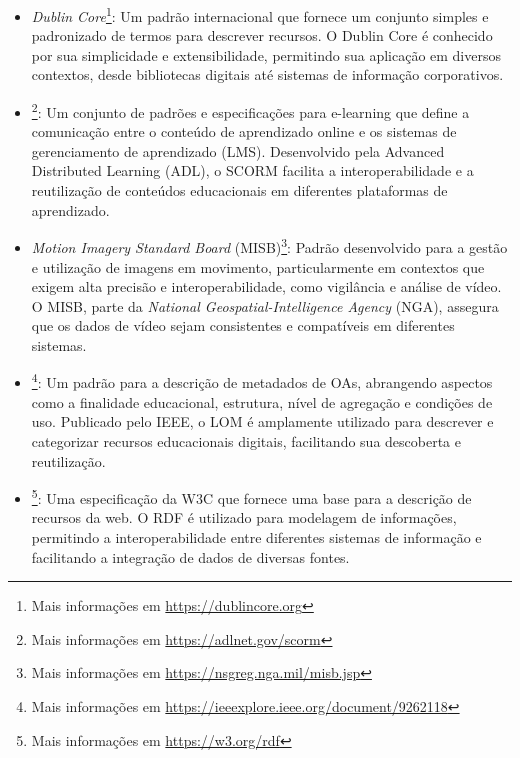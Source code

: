 \begin{itemize}
    \item \textit{Dublin Core}\footnote{Mais informações em \url{https://dublincore.org}}: Um padrão internacional que fornece um conjunto simples e padronizado de termos para descrever recursos. O Dublin Core é conhecido por sua simplicidade e extensibilidade, permitindo sua aplicação em diversos contextos, desde bibliotecas digitais até sistemas de informação corporativos.
    \item {}\footnote{Mais informações em \url{https://adlnet.gov/scorm}}: Um conjunto de padrões e especificações para e-learning que define a comunicação entre o conteúdo de aprendizado online e os sistemas de gerenciamento de aprendizado (LMS). Desenvolvido pela Advanced Distributed Learning (ADL), o SCORM facilita a interoperabilidade e a reutilização de conteúdos educacionais em diferentes plataformas de aprendizado.
    \item \textit{Motion Imagery Standard Board} (MISB)\footnote{Mais informações em \url{https://nsgreg.nga.mil/misb.jsp}}: Padrão desenvolvido para a gestão e utilização de imagens em movimento, particularmente em contextos que exigem alta precisão e interoperabilidade, como vigilância e análise de vídeo. O MISB, parte da \textit{National Geospatial-Intelligence Agency} (NGA), assegura que os dados de vídeo sejam consistentes e compatíveis em diferentes sistemas.
    \item {}\footnote{Mais informações em \url{https://ieeexplore.ieee.org/document/9262118}}: Um padrão para a descrição de metadados de OAs, abrangendo aspectos como a finalidade educacional, estrutura, nível de agregação e condições de uso. Publicado pelo IEEE, o LOM é amplamente utilizado para descrever e categorizar recursos educacionais digitais, facilitando sua descoberta e reutilização.
    \item {}\footnote{Mais informações em \url{https://w3.org/rdf}}: Uma especificação da W3C que fornece uma base para a descrição de recursos da web. O RDF é utilizado para modelagem de informações, permitindo a interoperabilidade entre diferentes sistemas de informação e facilitando a integração de dados de diversas fontes.
\end{itemize}

